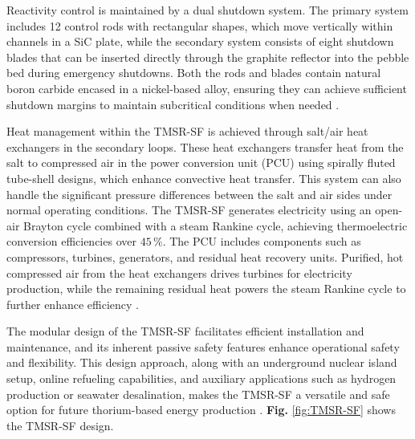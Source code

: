 Reactivity control is maintained by a dual shutdown system. The primary system includes 12 control rods with rectangular shapes, which move vertically within channels in a SiC plate, while the secondary system consists of eight shutdown blades that can be inserted directly through the graphite reflector into the pebble bed during emergency shutdowns. Both the rods and blades contain natural boron carbide encased in a nickel-based alloy, ensuring they can achieve sufficient shutdown margins to maintain subcritical conditions when needed \cite{TMSR_book}.

Heat management within the TMSR-SF is achieved through salt/air heat exchangers in the secondary loops. These heat exchangers transfer heat from the salt to compressed air in the power conversion unit (PCU) using spirally fluted tube-shell designs, which enhance convective heat transfer. This system can also handle the significant pressure differences between the salt and air sides under normal operating conditions. The TMSR-SF generates electricity using an open-air Brayton cycle combined with a steam Rankine cycle, achieving thermoelectric conversion efficiencies over \(45 \, \%\). The PCU includes components such as compressors, turbines, generators, and residual heat recovery units. Purified, hot compressed air from the heat exchangers drives turbines for electricity production, while the remaining residual heat powers the steam Rankine cycle to further enhance efficiency \cite{TMSR_book}.

The modular design of the TMSR-SF facilitates efficient installation and maintenance, and its inherent passive safety features enhance operational safety and flexibility. This design approach, along with an underground nuclear island setup, online refueling capabilities, and auxiliary applications such as hydrogen production or seawater desalination, makes the TMSR-SF a versatile and safe option for future thorium-based energy production \cite{TMSR_book}. \textbf{Fig.} \ref{fig:TMSR-SF} shows the TMSR-SF design. 

